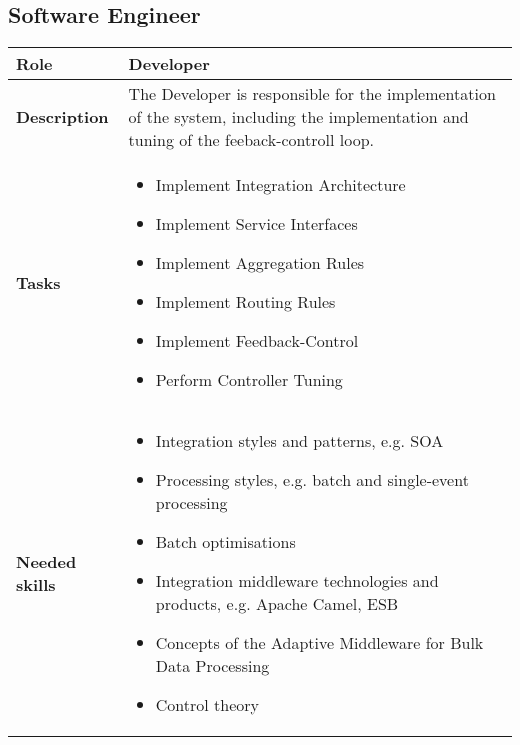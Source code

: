 \subsection{Software Engineer}
\begin{minipage}{\textwidth}
 \label{table:ch6_Role_Developer}
\begin{tabular}
	{|m{2cm}|m{10cm}|} \hline \bfseries Role & Developer\\
	\hline \bfseries Description & The Developer is responsible for the implementation of the system, including the implementation and tuning of the feeback-controll loop.\\
	\hline \bfseries Tasks & 
	\begin{itemize}
		\item Implement Integration Architecture
		\item Implement Service Interfaces
		\item Implement Aggregation Rules
		\item Implement Routing Rules
		\item Implement Feedback-Control
		\item Perform Controller Tuning
	\end{itemize}
	\\
	\hline 
	\bfseries Needed skills &
	\begin{itemize}
		\item Integration styles and patterns, e.g. \ac{SOA}
		\item Processing styles, e.g. batch and single-event processing
		\item Batch optimisations
		\item Integration middleware technologies and products, e.g. Apache Camel, \ac{ESB}
		\item Concepts of the Adaptive Middleware for Bulk Data Processing
		\item Control theory
	\end{itemize}
	\\
	\hline
\end{tabular}
\end{minipage}

